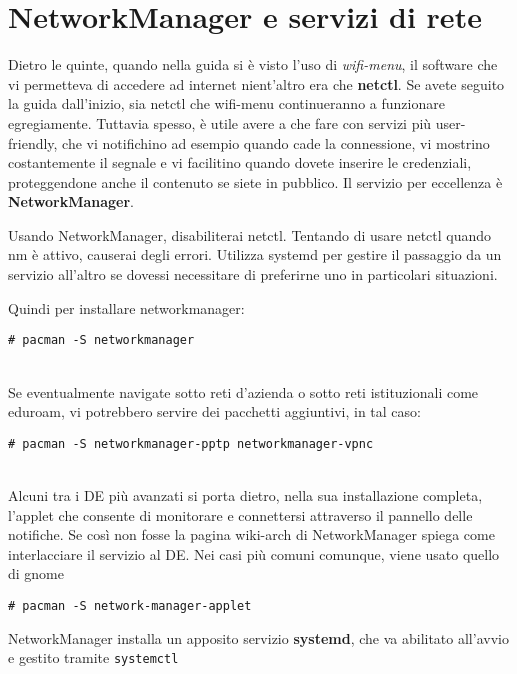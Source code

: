 \documentclass[twoside,italian]{book}
\newcommand{\code}[1]{\texttt{#1}}
\newcommand{\centcode}[1]{

\definecolor{codice}{rgb}{0.5,0.1,0.1}

	\begin{center}
		\color{codice}
		\code{#1}
	\end{center}


}
\newcommand{\nlinea}{
	\leavevmode
	\\
}
\begin{document}
		\section{NetworkManager e servizi di rete}
			Dietro le quinte, quando nella guida si è visto l'uso di \textit{wifi-menu}, il software che vi permetteva di accedere ad internet nient'altro era che \textbf{netctl}. Se avete seguito la guida dall'inizio, sia netctl che wifi-menu continueranno a funzionare egregiamente. 
			Tuttavia spesso, è utile avere a che fare con servizi più user-friendly, che vi notifichino ad esempio quando cade la connessione, vi mostrino costantemente il segnale e vi facilitino quando dovete inserire le credenziali, proteggendone anche il contenuto se siete in pubblico.
			Il servizio per eccellenza è \textbf{NetworkManager}.
			
			\begin{tcolorbox}[floatplacement=b,width=\textwidth,colback={blue},title={NOTA BENE:},colbacktitle=gray,coltitle=white,colupper=white]
				Usando NetworkManager, disabiliterai netctl. Tentando di usare netctl quando nm è attivo, causerai degli errori. Utilizza systemd per gestire il passaggio da un servizio all'altro se dovessi necessitare di preferirne uno in particolari situazioni.
			\end{tcolorbox}
		
			Quindi per installare networkmanager: \centcode{\# pacman -S networkmanager}
			\nlinea
			Se eventualmente navigate sotto reti d'azienda o sotto reti istituzionali come eduroam, vi potrebbero servire dei pacchetti aggiuntivi, in tal caso:
			\centcode{\# pacman -S networkmanager-pptp networkmanager-vpnc}
			\nlinea
			
			Alcuni tra i DE più avanzati si porta dietro, nella sua installazione completa, l'applet che consente di monitorare e connettersi attraverso il pannello delle notifiche. Se così non fosse la pagina wiki-arch di NetworkManager spiega come interlacciare il servizio al DE.
			Nei casi più comuni comunque, viene usato quello di gnome \centcode{\# pacman -S network-manager-applet}
			
			NetworkManager installa un apposito servizio \textbf{systemd}, che va abilitato all'avvio e gestito tramite \code{systemctl}
			
\end{document}
